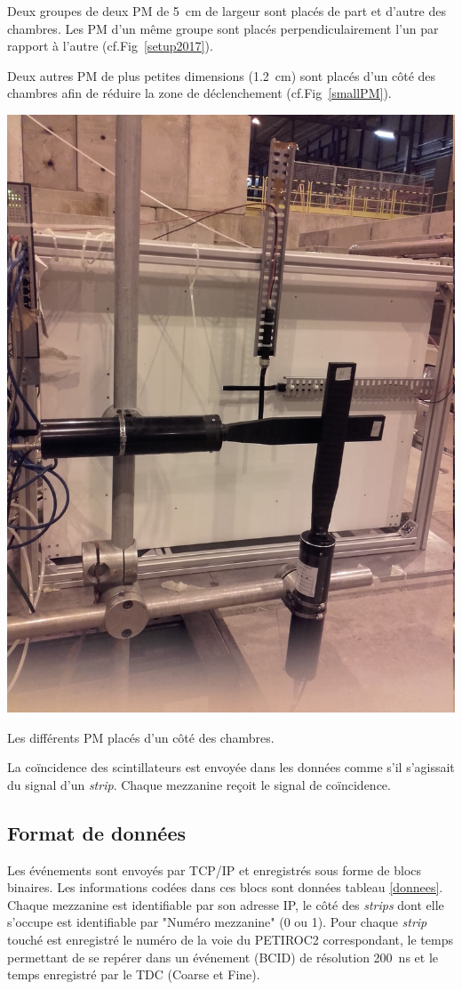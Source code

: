 Deux groupes de deux PM de \SI{5}{\centi\meter} de largeur sont placés de part et d'autre des chambres. Les PM d'un même groupe sont placés perpendiculairement l'un par rapport à l'autre (cf.Fig~\ref{setup2017}). 

Deux autres PM de plus petites dimensions (\SI{1.2}{\centi\meter}) sont placés d'un côté des chambres afin de réduire la zone de déclenchement (cf.Fig~\ref{smallPM}).  

\marginpar
{
	\centering
	\includegraphics[width=\marginparwidth]{ELE/BigSmallScintillators.jpg}
	\captionsetup{type=figure}\caption{Les différents PM placés d'un côté des chambres.}
	\label{smallPM}
}

La coïncidence des scintillateurs est envoyée dans les données comme s'il s'agissait du signal d'un \textit{strip}. Chaque mezzanine reçoit le signal de coïncidence.
\vspace*{-0.4cm}
\subsection{Format de données}
\vspace*{-0.4cm}
Les événements sont envoyés par TCP/IP et enregistrés sous forme de blocs binaires. Les informations codées dans ces blocs sont données tableau \ref{donnees}. Chaque mezzanine est identifiable par son adresse IP, le côté des \textit{strips} dont elle s'occupe est identifiable par "Numéro mezzanine" (\num{0} ou \num{1}). Pour chaque \textit{strip} touché est enregistré le numéro de la voie du PETIROC2 correspondant, le temps permettant de se repérer dans un événement (BCID) de résolution \SI{200}{\nano\second} et le temps enregistré par le TDC (Coarse et Fine).

